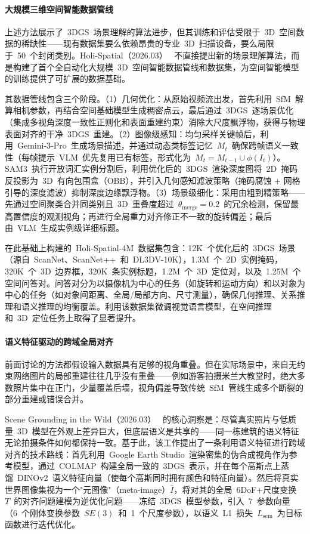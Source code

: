 \paragraph{大规模三维空间智能数据管线}

上述方法展示了~3DGS~场景理解的算法进步，但其训练和评估受限于~3D~空间数据的稀缺性——现有数据集要么依赖昂贵的专业~3D~扫描设备，要么局限于~50~个封闭类别。Holi-Spatial（2026.03）~\cite{2603_07660} 不直接提出新的场景理解算法，而是构建了首个全自动化大规模~3D~空间智能数据管线和数据集，为空间智能模型的训练提供了可扩展的数据基础。

其数据管线包含三个阶段。（1）几何优化：从原始视频流出发，首先利用~SfM~解算相机参数，再结合空间基础模型生成稠密点云，最后通过~3DGS~逐场景优化（集成多视角深度一致性正则化和表面重建约束）消除大尺度飘浮物，获得与物理表面对齐的干净~3DGS~重建。（2）图像级感知：均匀采样关键帧后，利用~Gemini-3-Pro~生成场景描述，并通过动态类标签记忆~$M_t$~确保跨帧语义一致性（每帧提示~VLM~优先复用已有标签，形式化为~$M_t = M_{t-1} \cup \phi(I_t)$）。SAM3~执行开放词汇实例分割后，利用优化后的~3DGS~渲染深度图将~2D~掩码反投影为~3D~有向包围盒（OBB），并引入几何感知滤波策略（掩码腐蚀 + 网格引导的深度滤波）抑制深度边缘飘浮物。（3）场景级细化：采用由粗到精策略——先通过空间聚类合并同类别且~3D~重叠度超过~$\theta_{\text{merge}} = 0.2$~的冗余检测，保留最高置信度的观测视角；再进行全局重力对齐修正不一致的旋转偏差；最后由~VLM~生成实例级详细标题。

在此基础上构建的~Holi-Spatial-4M~数据集包含：12K~个优化后的~3DGS~场景（源自~ScanNet、ScanNet++~和~DL3DV-10K），1.3M~个~2D~实例掩码，320K~个~3D~边界框，320K~条实例标题，1.2M~个~3D~定位对，以及~1.25M~个空间问答对。问答对分为以摄像机为中心的任务（如旋转和运动方向）和以对象为中心的任务（如对象间距离、全局/局部方向、尺寸测量），确保几何推理、关系推理和语义推理的均衡覆盖。利用该数据集微调视觉语言模型，在空间推理和~3D~定位任务上取得了显著提升。

\paragraph{语义特征驱动的跨域全局对齐}

前面讨论的方法都假设输入数据具有足够的视角重叠。但在实际场景中，来自无约束网络图片的局部重建往往几乎没有重叠——例如游客拍摄米兰大教堂时，绝大多数照片集中在正门，少量覆盖后墙，视角偏差导致传统~SfM~管线生成多个断裂的部分重建或错误合并。

Scene Grounding in the Wild（2026.03）~\cite{2603_26584} 的核心洞察是：尽管真实照片与低质量~3D~模型在外观上差异巨大，但底层语义是共享的——同一栋建筑的语义特征无论拍摄条件如何都保持一致。基于此，该工作提出了一条利用语义特征进行跨域对齐的技术路线：首先利用~Google Earth Studio~渲染密集的伪合成视角作为参考模型，通过~COLMAP~构建全局一致的~3DGS~表示，并在每个高斯点上蒸馏~DINOv2~语义特征向量（使每个高斯同时拥有颜色和特征向量）。然后将真实世界图像集视为一个"元图像"（meta-image）$\bar{I}$，将对其的全局~6DoF+尺度变换~$T$~的对齐问题建模为逆优化问题——冻结~3DGS~模型参数，引入~7~参数向量（6~个刚体变换参数~$SE(3)$~和~1~个尺度参数），以语义~L1~损失~$L_{\text{sem}}$~为目标函数进行迭代优化。

